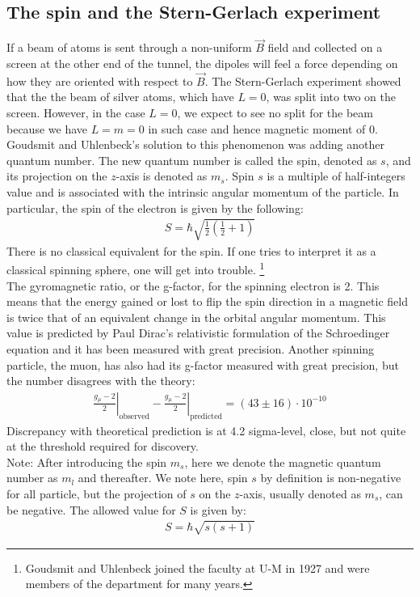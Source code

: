 \documentclass[11pt]{article}
\theoremstyle{break}
\theoremstyle{break}
\newcommand{\note}{\color{red}Note: \color{black}}
\begin{document}
\subsection{The spin and the Stern-Gerlach experiment}
If a beam of atoms is sent through a non-uniform $\vec{B}$ field and collected on a screen at the other end of the tunnel, the dipoles will feel a force depending on how they are oriented with respect to $\vec{B}$. The Stern-Gerlach experiment showed that the the beam of silver atoms, which have $L = 0$, was split into two on the screen. However, in the case $L=0$, we expect to see no split for the beam because we have $L=m=0$ in such case and hence magnetic moment of $0$. Goudsmit and Uhlenbeck's solution to this phenomenon was adding another quantum number. The new quantum number is called the spin, denoted as $s$, and its projection on the $z$-axis is denoted as $m_s$. Spin $s$ is a multiple of half-integers value and is associated with the intrinsic angular momentum of the particle. In particular, the spin of the electron is given by the following:
\begin{align*}
S= \hbar \sqrt{\frac{1}{2}\left( \frac{1}{2}+1\right)}
\end{align*}
There is no classical equivalent for the spin. If one tries to interpret it as a classical spinning sphere, one will get into trouble. \footnote{Goudsmit and Uhlenbeck joined the faculty at U-M in 1927 and were members of the department for many years.}\\


The gyromagnetic ratio, or the g-factor, for the spinning electron is 2. This means that the energy gained or lost to flip the spin direction in a magnetic field is twice that of an equivalent change in the orbital angular momentum. This value is predicted by Paul Dirac's relativistic formulation of the Schroedinger equation and it has been measured with great precision. Another spinning particle, the muon, has also had its g-factor measured with great precision, but the number disagrees with the theory:
\begin{align*}
\left.\frac{g_{\mu}-2}{2}\right|_{\text{observed}} - \left.\frac{g_{\mu}-2}{2}\right|_{\text{predicted}} = (43\pm 16)\cdot 10^{-10} 
\end{align*}
Discrepancy with theoretical prediction is at 4.2 sigma-level, close, but not quite at the threshold required for discovery. \\

\note After introducing the spin $m_s$, here we denote the magnetic quantum number as $m_l$ and thereafter. We note here, spin $s$ by definition is non-negative for all particle, but the projection of $s$ on the $z$-axis, usually denoted as $m_s$, can be negative. The allowed value for $S$ is given by:
\begin{align*}
S = \hbar\sqrt{s(s+1)}
\end{align*}
\end{document}
